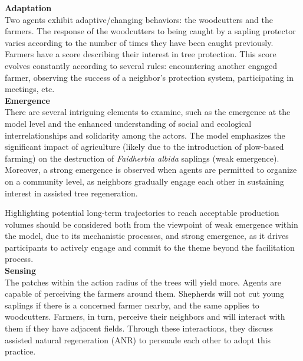 \documentclass{article}
\begin{document}

        \textbf{Adaptation}\\
        
        Two agents exhibit adaptive/changing behaviors: the woodcutters and the farmers. The response of the woodcutters to being caught by a sapling protector varies according to the number of times they have been caught previously. Farmers have a score describing their interest in tree protection. This score evolves constantly according to several rules: encountering another engaged farmer, observing the success of a neighbor's protection system, participating in meetings, etc.\\

        \textbf{Emergence}\\


        There are several intriguing elements to examine, such as the emergence at the model level and the enhanced understanding of social and ecological interrelationships and solidarity among the actors. The model emphasizes the significant impact of agriculture (likely due to the introduction of plow-based farming) on the destruction of \textit{Faidherbia albida} saplings (weak emergence). Moreover, a strong emergence is observed when agents are permitted to organize on a community level, as neighbors gradually engage each other in sustaining interest in assisted tree regeneration.

        Highlighting potential long-term trajectories to reach acceptable production volumes should be considered both from the viewpoint of weak emergence within the model, due to its mechanistic processes, and strong emergence, as it drives participants to actively engage and commit to the theme beyond the facilitation process.\\


        \textbf{Sensing}\\


        The patches within the action radius of the trees will yield more. Agents are capable of perceiving the farmers around them. Shepherds will not cut young saplings if there is a concerned farmer nearby, and the same applies to woodcutters. Farmers, in turn, perceive their neighbors and will interact with them if they have adjacent fields. Through these interactions, they discuss assisted natural regeneration (ANR) to persuade each other to adopt this practice.
\end{document}
